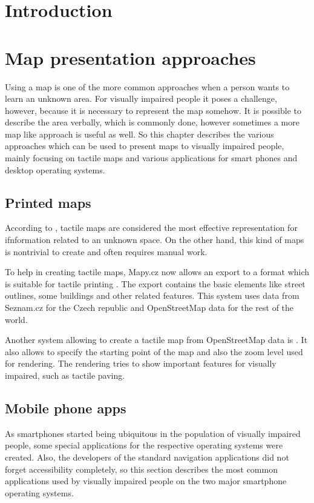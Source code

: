 \documentclass[nolof,digital]{fithesis3}
\begin{document}
\chapter{Introduction}
\chapter{Map presentation approaches}
Using a map is one of the more common approaches when a person wants to learn an unknown area. For visually impaired people it poses a challenge, however, because it is necessary to represent the map somehow. It is possible to describe the area verbally, which is commonly done, however sometimes a more map like approach is useful as well. So this chapter describes the various approaches which can be used to present maps to visually impaired people, mainly focusing on tactile maps and various applications for smart phones and desktop operating systems.
\section{Printed maps}
According to \parencite{orientation_aids_from_foundations}, tactile maps are considered the most effective representation for ifnformation related to an unknown space. On the other hand, this kind of maps is nontrivial to create and often requires manual work.

To help in creating tactile maps, Mapy.cz now allows an export to a format which is suitable for tactile printing \parencite{mapycz}. The export contains the basic elements like street outlines, some buildings and other related features. This system uses data from Seznam.cz for the Czech republic and OpenStreetMap data for the rest of the world.

Another system allowing to create a tactile map from OpenStreetMap data is \parencite{tactile_osm_maps}. It also allows to specify the starting point of the map and also the zoom level used for rendering. The rendering tries to show important features for visually impaired, such as tactile paving.
\section{Mobile phone apps}
As smartphones started being ubiquitous in the population of visually impaired people, some special applications for the respective operating systems were created. Also, the developers of the standard navigation applications did not forget accessibility completely, so this section describes the most common applications used by visually impaired people on the two major smartphone operating systems.
\end{document}
